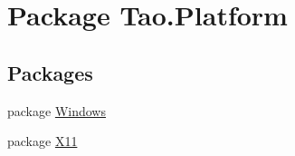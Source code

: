 \hypertarget{namespace_tao_1_1_platform}{
\section{Package Tao.Platform}
\label{namespace_tao_1_1_platform}
}
\subsection*{Packages}
\begin{DoxyCompactItemize}
\item 
package \hyperlink{namespace_tao_1_1_platform_1_1_windows}{Windows}
\item 
package \hyperlink{namespace_tao_1_1_platform_1_1_x11}{X11}
\end{DoxyCompactItemize}
